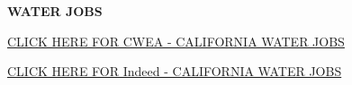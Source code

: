 \documentclass{article}
\begin{document}
%
%
%
%
\newpage
\textbf{WATER JOBS}
\begin{tcolorbox}[width=17cm,box align=center, halign=center,  valign=center,colback={my-blue},title={}, colbacktitle=yellow,coltitle=blue]    
\href{https://jobs.cwea.org/jobs}{CLICK HERE FOR CWEA - CALIFORNIA WATER JOBS }
\end{tcolorbox}

\begin{tcolorbox}[width=17cm,box align=center, halign=center,  valign=center,colback={my-blue},title={}, colbacktitle=yellow,coltitle=blue]    
\href{https://www.indeed.com/jobs?q=water&l=California&vjk=b526b311e601df8c}{CLICK HERE FOR Indeed - CALIFORNIA WATER JOBS }
\end{tcolorbox}
\end{document}
